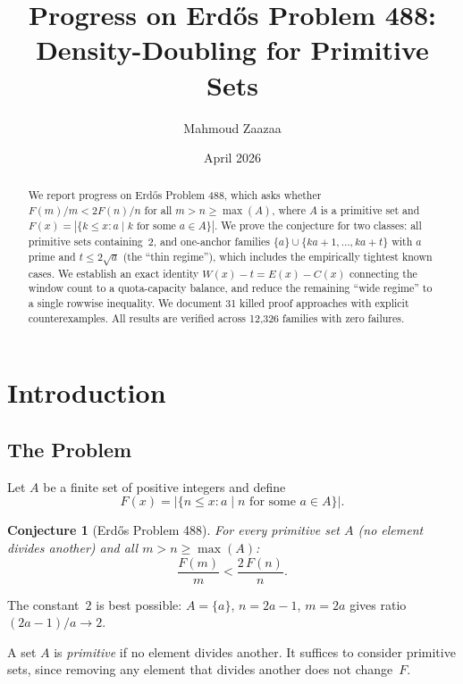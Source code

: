 \documentclass[11pt,a4paper]{article}
\title{Progress on Erd\H{o}s Problem 488:\\Density-Doubling for Primitive Sets}
\author{Mahmoud Zaazaa}
\date{April 2026}
\newtheorem{conjecture}[theorem]{Conjecture}
\theoremstyle{definition}
\begin{document}
\maketitle

\begin{abstract}
We report progress on Erd\H{o}s Problem 488, which asks whether 
$F(m)/m < 2 F(n)/n$ for all $m > n \geq \max(A)$, where $A$ is a 
primitive set and $F(x) = |\{k \leq x : a \mid k \text{ for some } a \in A\}|$.
We prove the conjecture for two classes: all primitive sets containing~$2$, 
and one-anchor families $\{a\} \cup \{ka+1,\ldots,ka+t\}$ with $a$ prime and 
$t \leq 2\sqrt{a}$ (the ``thin regime''), which includes the empirically 
tightest known cases. We establish an exact identity 
$W(x) - t = E(x) - C(x)$ connecting the window count to a 
quota-capacity balance, and reduce the remaining ``wide regime'' to a 
single rowwise inequality. We document 31 killed proof approaches with 
explicit counterexamples. All results are verified across 12{,}326 families 
with zero failures.
\end{abstract}

\tableofcontents
\newpage

\section{Introduction}

\subsection{The Problem}

Let $A$ be a finite set of positive integers and define
\[
F(x) = \bigl|\{n \leq x : a \mid n \text{ for some } a \in A\}\bigr|.
\]

\begin{conjecture}[Erd\H{o}s Problem 488]
For every primitive set $A$ (no element divides another) and all 
$m > n \geq \max(A)$:
\[
\frac{F(m)}{m} < \frac{2\,F(n)}{n}.
\]
\end{conjecture}

The constant~$2$ is best possible: $A = \{a\}$, $n = 2a-1$, $m = 2a$ 
gives ratio $(2a-1)/a \to 2$.

A set $A$ is \emph{primitive} if no element divides another. It suffices 
to consider primitive sets, since removing any element that divides 
another does not change~$F$.
\end{document}
